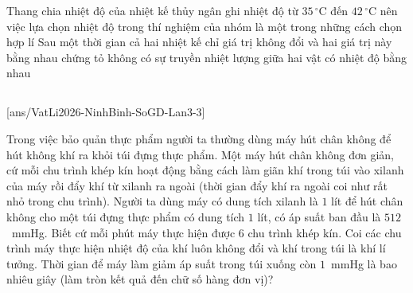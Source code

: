 \begin{ex}
		{\True Thang chia nhiệt độ của nhiệt kế thủy ngân ghi nhiệt độ từ $35\,^\circ\text{C}$ đến $42\,^\circ\text{C}$ nên việc lựa chọn nhiệt độ trong thí nghiệm của nhóm là một trong những cách chọn hợp lí}
		{\True Sau một thời gian cả hai nhiệt kế chỉ giá trị không đổi và hai giá trị này bằng nhau chứng tỏ không có sự truyền nhiệt lượng giữa hai vật có nhiệt độ bằng nhau}
	\end{ex}

	\subsection*{}
	\setcounter{ex}{0}
	[ans/VatLi2026-NinhBinh-SoGD-Lan3-3]

	\begin{ex}%
		Trong việc bảo quản thực phẩm người ta thường dùng máy hút chân không để hút không khí ra khỏi túi đựng thực phẩm. Một máy hút chân không đơn giản, cứ mỗi chu trình khép kín hoạt động bằng cách làm giãn khí trong túi vào xilanh của máy rồi đẩy khí từ xilanh ra ngoài (thời gian đẩy khí ra ngoài coi như rất nhỏ trong chu trình). Người ta dùng máy có dung tích xilanh là $1$ lít để hút chân không cho một túi đựng thực phẩm có dung tích $1$ lít, có áp suất ban đầu là $512$~mmHg. Biết cứ mỗi phút máy thực hiện được $6$ chu trình khép kín. Coi các chu trình máy thực hiện nhiệt độ của khí luôn không đổi và khí trong túi là khí lí tưởng. Thời gian để máy làm giảm áp suất trong túi xuống còn $1$~mmHg là bao nhiêu giây (làm tròn kết quả đến chữ số hàng đơn vị)?
		\par
	\end{ex}

